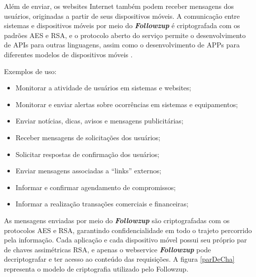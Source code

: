 \documentclass[12pt]{article}
\begin{document}
Além de enviar, os websites Internet também podem receber mensagens dos usuários, originadas a partir de seus dispositivos móveis. A comunicação entre sistemas e dispositivos móveis por meio do \textit{\textbf{Followzup }}é criptografada com os padrões AES e RSA, e o protocolo aberto do serviço permite o desenvolvimento de APIs para outras linguagens, assim como o desenvolvimento de APPs para diferentes modelos de dispositivos móveis \cite{followzup}.

Exemplos de uso:
\begin{itemize}
    \item Monitorar a atividade de usuários em sistemas e websites;
    \item Monitorar e enviar alertas sobre ocorrências em sistemas e equipamentos;
    \item Enviar notícias, dicas, avisos e mensagens publicitárias;
    \item Receber mensagens de solicitações dos usuários;
    \item Solicitar respostas de confirmação dos usuários;
    \item Enviar mensagens associadas a “links” externos;
    \item Informar e confirmar agendamento de compromissos;
    \item Informar a realização transações comerciais e financeiras;
    
\end{itemize}

As mensagens enviadas por meio do \textit{\textbf{Followzup }}são criptografadas com os protocolos AES e RSA, garantindo confidencialidade em todo o trajeto percorrido pela informação. Cada aplicação e cada dispositivo móvel possui seu próprio par de chaves assimétricas RSA, e apenas o webservice \textit{\textbf{Followzup }}pode decriptografar e ter acesso ao conteúdo das requisições. A figura \ref{parDeCha} representa o modelo de criptografia utilizado pelo Followzup.
\end{document}
